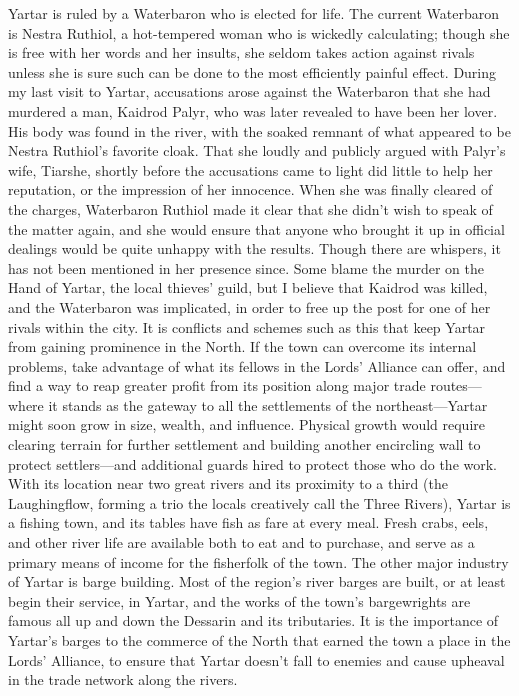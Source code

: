 \documentclass[10pt,a4paper,twoside,twocolumn,openany,bg=print,nodeprecatedcode]{dndbook}
\begin{document}
Yartar is ruled by a Waterbaron who is elected for life. The current Waterbaron is Nestra Ruthiol, a hot-tempered woman who is wickedly calculating; though she is free with her words and her insults, she seldom takes action against rivals unless she is sure such can be done to the most efficiently painful effect. During my last visit to Yartar, accusations arose against the Waterbaron that she had murdered a man, Kaidrod Palyr, who was later revealed to have been her lover. His body was found in the river, with the soaked remnant of what appeared to be Nestra Ruthiol's favorite cloak. That she loudly and publicly argued with Palyr's wife, Tiarshe, shortly before the accusations came to light did little to help her reputation, or the impression of her innocence. When she was finally cleared of the charges, Waterbaron Ruthiol made it clear that she didn't wish to speak of the matter again, and she would ensure that anyone who brought it up in official dealings would be quite unhappy with the results. Though there are whispers, it has not been mentioned in her presence since. Some blame the murder on the Hand of Yartar, the local thieves' guild, but I believe that Kaidrod was killed, and the Waterbaron was implicated, in order to free up the post for one of her rivals within the city.
It is conflicts and schemes such as this that keep Yartar from gaining prominence in the North. If the town can overcome its internal problems, take advantage of what its fellows in the Lords' Alliance can offer, and find a way to reap greater profit from its position along major trade routes—where it stands as the gateway to all the settlements of the northeast—Yartar might soon grow in size, wealth, and influence. Physical growth would require clearing terrain for further settlement and building another encircling wall to protect settlers—and additional guards hired to protect those who do the work.
With its location near two great rivers and its proximity to a third (the Laughingflow, forming a trio the locals creatively call the Three Rivers), Yartar is a fishing town, and its tables have fish as fare at every meal. Fresh crabs, eels, and other river life are available both to eat and to purchase, and serve as a primary means of income for the fisherfolk of the town.
The other major industry of Yartar is barge building. Most of the region's river barges are built, or at least begin their service, in Yartar, and the works of the town's bargewrights are famous all up and down the Dessarin and its tributaries. It is the importance of Yartar's barges to the commerce of the North that earned the town a place in the Lords' Alliance, to ensure that Yartar doesn't fall to enemies and cause upheaval in the trade network along the rivers.
\end{document}
